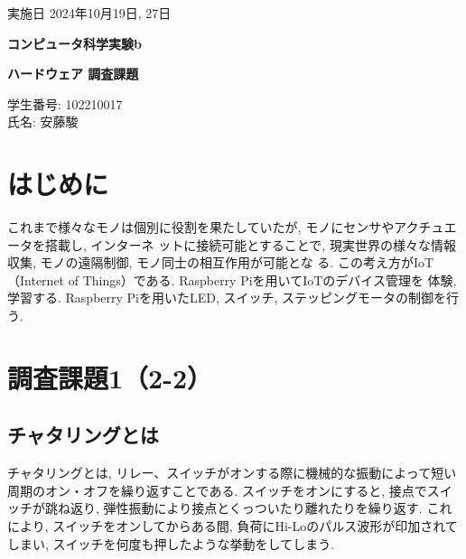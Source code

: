 \documentclass{ltjsarticle} %
\begin{document}
\thispagestyle{empty}
\begin{flushright}
{\large 実施日 2024年10月19日, 27日{\hspace{5cm}}} 
\end{flushright}

\vspace*{\fill}
\centering
{\Huge\bf コンピュータ科学実験b}
\vspace*{1cm}

{\huge\bf ハードウェア 調査課題}
\vspace*{\fill}

\vspace*{\fill}

\vspace*{\fill}

\begin{flushright}
{\large 学生番号: 102210017} \\ %
{\large 氏名: 安藤駿} \\
\end{flushright}

\clearpage

\addtocounter{page}{-1}
\raggedright
\setlength{\parindent}{1em}

\section{はじめに}
これまで様々なモノは個別に役割を果たしていたが, モノにセンサやアクチュエータを搭載し, インターネ
ットに接続可能とすることで, 現実世界の様々な情報収集, モノの遠隔制御, モノ同⼠の相互作⽤が可能とな
る. この考え⽅がIoT（Internet of Things）である. Raspberry Piを⽤いてIoTのデバイス管理を
体験, 学習する. Raspberry Piを⽤いたLED, スイッチ, ステッピングモータの制御を⾏う.


\section{調査課題1（2-2）}

\subsection{チャタリングとは}
チャタリングとは, リレー、スイッチがオンする際に機械的な振動によって短い周期のオン・オフを繰り返すことである. 
スイッチをオンにすると, 接点でスイッチが跳ね返り, 弾性振動により接点とくっついたり離れたりを繰り返す.
これにより, スイッチをオンしてからある間, 負荷にHi-Loのパルス波形が印加されてしまい, スイッチを何度も押したような挙動をしてしまう. 
\end{document}
